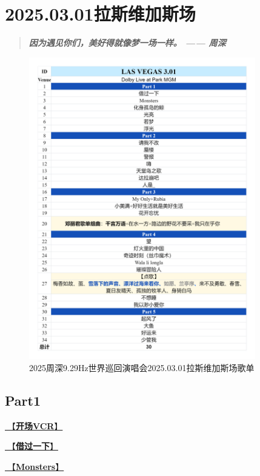 \documentclass[]{ctexbook}
\begin{document}
\chapter{2025.03.01拉斯维加斯场}\label{LasVegas-20250301}

\begin{quote}
\textbf{\emph{因为遇见你们，美好得就像梦一场一样。 ------ 周深}}
\end{quote}

\begin{figure}

{\centering \includegraphics[width=280pt]{img/playlists/playlists-lasvegas-20250301} 

}

\caption{2025周深9.29Hz世界巡回演唱会2025.03.01拉斯维加斯场歌单}\label{fig:unnamed-chunk-178}
\end{figure}

\newpage

\section{Part1}\label{LasVegas-20250301-part1}

\hyperref[opening-vcr]{🎥【\textbf{开场VCR}】}

\hyperref[I-will-go-my-way]{🎵【\textbf{借过一下}】}

\hyperref[Monsters]{🎵【\textbf{Monsters}】}
\end{document}
